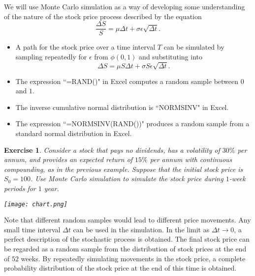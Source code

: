 \documentclass[letterpaper,10pt]{article}
\newtheorem{ex}{Exercise}
\begin{document}
\noindent We will use Monte Carlo simulation as a way of developing some understanding of the nature of the stock price process described by the equation $$\frac{\Delta S}{S}=\mu\Delta t+\sigma\epsilon\sqrt{\Delta t}.$$

\begin{itemize}

\item A path for the stock price over a time interval $T$ can be simulated by sampling repeatedly for $\epsilon$ from $\phi(0,1)$ and substituting into $$\Delta S=\mu S\Delta t+\sigma S\epsilon\sqrt{\Delta t}.$$

\item The expression ``=RAND()" in Excel computes a random sample between $0$ and $1$.

\item The inverse cumulative normal distribution is ``NORMSINV" in Excel.

\item The expression ``=NORMSINV(RAND())" produces a random sample from a standard normal distribution in Excel.

\end{itemize}
\begin{ex}
Consider a stock that pays no dividends, has a volatility of $30\%$ per annum, and provides an expected return of $15\%$ per annum with continuous compounding, as in the previous example.  Suppose that the initial stock price is $S_0=100$.  Use Monte Carlo simulation to simulate the stock price during $1$-week periods for $1$ year. 

\begin{center}
\texttt{[image: chart.png]}
\end{center}

\end{ex}

\noindent Note that different random samples would lead to different price movements. Any small time interval $\Delta t$ can be used in the simulation. In the limit as $\Delta t\rightarrow 0$, a perfect description of the stochastic process is obtained. The final stock price can be regarded as a random sample from the distribution of stock prices at the end of $52$ weeks. By repeatedly simulating movements in the stock price, a complete probability distribution of the stock price at the end of this time is obtained.
\end{document}
